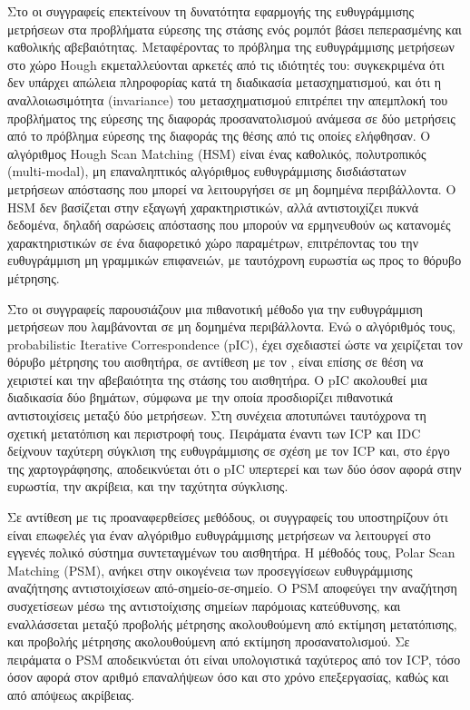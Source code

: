 Στο \cite{Censia} οι συγγραφείς επεκτείνουν τη δυνατότητα εφαρμογής της
ευθυγράμμισης μετρήσεων στα προβλήματα εύρεσης της στάσης ενός ρομπότ βάσει
πεπερασμένης και καθολικής αβεβαιότητας. Μεταφέροντας το πρόβλημα της
ευθυγράμμισης μετρήσεων στο χώρο Hough εκμεταλλεύονται αρκετές από τις
ιδιότητές του: συγκεκριμένα ότι δεν υπάρχει απώλεια πληροφορίας κατά τη
διαδικασία μετασχηματισμού, και ότι η αναλλοιωσιμότητα (invariance) του
μετασχηματισμού επιτρέπει την απεμπλοκή του προβλήματος της εύρεσης της
διαφοράς προσανατολισμού ανάμεσα σε δύο μετρήσεις από το πρόβλημα εύρεσης της
διαφοράς της θέσης από τις οποίες ελήφθησαν. Ο αλγόριθμος Hough Scan Matching
(HSM) είναι ένας καθολικός, πολυτροπικός (multi-modal), μη επαναληπτικός
αλγόριθμος ευθυγράμμισης δισδιάστατων μετρήσεων απόστασης που μπορεί να
λειτουργήσει σε μη δομημένα περιβάλλοντα. Ο HSM δεν βασίζεται στην εξαγωγή
χαρακτηριστικών, αλλά αντιστοιχίζει πυκνά δεδομένα, δηλαδή σαρώσεις απόστασης
που μπορούν να ερμηνευθούν ως κατανομές χαρακτηριστικών σε ένα διαφορετικό χώρο
παραμέτρων, επιτρέποντας του την ευθυγράμμιση μη γραμμικών επιφανειών, με
ταυτόχρονη ευρωστία ως προς το θόρυβο μέτρησης.

Στο \cite{Montesano2005} οι συγγραφείς παρουσιάζουν μια πιθανοτική μέθοδο για
την ευθυγράμμιση μετρήσεων που λαμβάνονται σε μη δομημένα περιβάλλοντα. Ενώ ο
αλγόριθμός τους, probabilistic Iterative Correspondence (pIC), έχει σχεδιαστεί
ώστε να χειρίζεται τον θόρυβο μέτρησης του αισθητήρα, σε αντίθεση με τον
\cite{Pfistera}, είναι επίσης σε θέση να χειριστεί και την αβεβαιότητα της
στάσης του αισθητήρα. O pIC ακολουθεί μια διαδικασία δύο βημάτων, σύμφωνα με
την οποία προσδιορίζει πιθανοτικά αντιστοιχίσεις μεταξύ δύο μετρήσεων. Στη
συνέχεια αποτυπώνει ταυτόχρονα τη σχετική μετατόπιση και περιστροφή τους.
Πειράματα έναντι των ICP και IDC δείχνουν ταχύτερη σύγκλιση της ευθυγράμμισης
σε σχέση με τον ICP και, στο έργο της χαρτογράφησης, αποδεικνύεται ότι ο pIC
υπερτερεί και των δύο όσον αφορά στην ευρωστία, την ακρίβεια, και την ταχύτητα
σύγκλισης.

Σε αντίθεση με τις προαναφερθείσες μεθόδους, οι συγγραφείς του \cite{Diosi2005}
υποστηρίζουν ότι είναι επωφελές για έναν αλγόριθμο ευθυγράμμισης μετρήσεων να
λειτουργεί στο εγγενές πολικό σύστημα συντεταγμένων του αισθητήρα. Η μέθοδός
τους, Polar Scan Matching (PSM), ανήκει στην οικογένεια των προσεγγίσεων
ευθυγράμμισης αναζήτησης αντιστοιχίσεων από-σημείο-σε-σημείο. O PSM αποφεύγει
την αναζήτηση συσχετίσεων μέσω της αντιστοίχισης σημείων παρόμοιας κατεύθυνσης,
και εναλλάσσεται μεταξύ προβολής μέτρησης ακολουθούμενη από εκτίμηση
μετατόπισης, και προβολής μέτρησης ακολουθούμενη από εκτίμηση προσανατολισμού.
Σε πειράματα ο PSM αποδεικνύεται ότι είναι υπολογιστικά ταχύτερος από τον ICP,
τόσο όσον αφορά στον αριθμό επαναλήψεων όσο και στο χρόνο επεξεργασίας, καθώς
και από απόψεως ακρίβειας.

